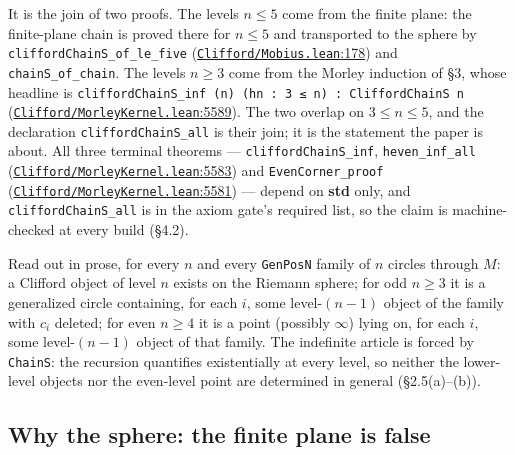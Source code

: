 \documentclass[11pt]{article}
\theoremstyle{definition}
\theoremstyle{remark}
\begin{document}
It is the join of two proofs. The levels \(n \le 5\) come from the finite plane: the finite-plane chain is
proved there for \(n \le 5\) and transported to the sphere by \texttt{cliffordChainS\_\allowbreak of\_\allowbreak le\_\allowbreak five}
(\href{https://github.com/jpbald93/paperl_clifford_chain/blob/e1ae145c2565cc98816635387412edc0a740c27c/Clifford/Mobius.lean\#L178}{\texttt{Clifford/\allowbreak Mobius.lean}:178}) and \texttt{chainS\_\allowbreak of\_\allowbreak chain}. The levels \(n \ge 3\) come from the Morley induction of
\S{}3, whose headline is \texttt{cliffordChainS\_\allowbreak inf\ (n)\ (hn\ \allowbreak :\ 3\ ≤\ n)\ \allowbreak :\ CliffordChainS\ n}
(\href{https://github.com/jpbald93/paperl_clifford_chain/blob/e1ae145c2565cc98816635387412edc0a740c27c/Clifford/MorleyKernel.lean\#L5589}{\texttt{Clifford/\allowbreak MorleyKernel.lean}:5589}). The two overlap on \(3 \le n \le 5\), and the declaration
\texttt{cliffordChainS\_\allowbreak all} is their join; it is the statement the paper is about. All three terminal theorems ---
\texttt{cliffordChainS\_\allowbreak inf}, \texttt{heven\_\allowbreak inf\_\allowbreak all} (\href{https://github.com/jpbald93/paperl_clifford_chain/blob/e1ae145c2565cc98816635387412edc0a740c27c/Clifford/MorleyKernel.lean\#L5583}{\texttt{Clifford/\allowbreak MorleyKernel.lean}:5583}) and \texttt{EvenCorner\_\allowbreak proof}
(\href{https://github.com/jpbald93/paperl_clifford_chain/blob/e1ae145c2565cc98816635387412edc0a740c27c/Clifford/MorleyKernel.lean\#L5581}{\texttt{Clifford/\allowbreak MorleyKernel.lean}:5581}) --- depend on \textbf{std} only, and \texttt{cliffordChainS\_\allowbreak all} is in the axiom
gate's required list, so the claim is machine-checked at every build (\S{}4.2).

Read out in prose, for every \(n\) and every \texttt{GenPosN} family of \(n\) circles through \(M\): a Clifford object
of level \(n\) exists on the Riemann sphere; for odd \(n \ge 3\) it is a generalized circle containing, for
each \(i\), some level-\((n-1)\) object of the family with \(c_i\) deleted; for even \(n \ge 4\) it is a point
(possibly $\infty$) lying on, for each \(i\), some level-\((n-1)\) object of that family. The indefinite article is
forced by \texttt{ChainS}: the recursion quantifies existentially at every level, so neither the lower-level
objects nor the even-level point are determined in general (\S{}2.5(a)--(b)).

\hypertarget{why-the-sphere-the-finite-plane-is-false}{%
\subsection{Why the sphere: the finite plane is false}\label{why-the-sphere-the-finite-plane-is-false}}
\end{document}

